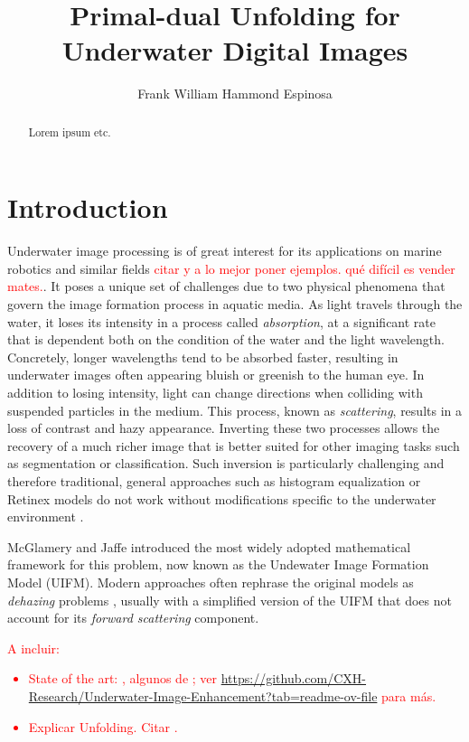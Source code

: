 \documentclass[twocolumn,twoside,a4paper,10pt]{IEEEtran}
\title{Primal-dual Unfolding for\\ Underwater Digital Images}
\author{Frank William Hammond Espinosa}
\newcommand{\Frank}[1]{\textcolor{red}{#1}}
\begin{document}

\maketitle



\begin{abstract}
\noindent Lorem ipsum etc.
\end{abstract}
\section{Introduction}

Underwater image processing is of great interest for its applications on marine robotics and similar fields \Frank{citar y a lo mejor poner ejemplos. qué difícil es vender mates.}. It poses a unique set of challenges due to two
physical phenomena that govern the image formation process in aquatic media. As light travels through the water, it loses its intensity in a process called \textit{absorption}, at a significant rate that is dependent both on the condition of the water and the light
wavelength. Concretely, longer wavelengths tend to be absorbed faster, resulting in underwater images often appearing bluish or greenish to the human eye. In addition to losing intensity, light can change directions when colliding with
suspended particles in the medium. This process, known as \textit{scattering}, results in a loss of contrast and hazy appearance. Inverting these two processes
allows the recovery of a much richer image that is better suited for other imaging tasks such as segmentation or classification. Such inversion is particularly challenging and therefore traditional, general approaches such as
histogram equalization or Retinex models do not work without modifications
specific to the underwater environment \cite{xie2021variational}.

McGlamery \cite{10.1117/12.958279} and Jaffe \cite{50695} introduced the most widely adopted mathematical framework for this problem, now known as the
Undewater Image Formation Model (UIFM). Modern approaches often rephrase the original models as \textit{dehazing} problems \cite{GALDRAN2015132}, usually with a simplified version of the UIFM that does not account for its \textit{forward scattering} component.

\Frank{A incluir:
\begin{itemize}
  \item State of the art: \cite{LI2022104759, 7574330, ancuti2017color, xie2021variational}, algunos de \cite{6319316}; ver \href{https://github.com/CXH-Research/Underwater-Image-Enhancement?tab=readme-ov-file}{https://github.com/CXH-Research/Underwater-Image-Enhancement?tab=readme-ov-file} para más.
  \item Explicar Unfolding. Citar \cite{8271999}.
\end{itemize}
}
\end{document}

